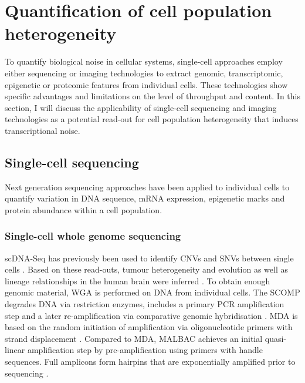 
\section{Quantification of cell population heterogeneity} 

To quantify biological noise in cellular systems, single-cell approaches employ either sequencing or imaging technologies to extract genomic, transcriptomic, epigenetic or proteomic features from individual cells. These technologies show specific advantages and limitations on the level of throughput and content. In this section, I will discuss the applicability of single-cell sequencing and imaging technologies as a potential read-out for cell population heterogeneity that induces transcriptional noise.

\subsection{Single-cell sequencing}

Next generation sequencing approaches have been applied to individual cells to quantify variation in DNA sequence, mRNA expression, epigenetic marks and protein abundance within a cell population. 

\subsubsection{Single-cell whole genome sequencing}

\Gls{scDNA-Seq} has previously been used to identify CNVs and SNVs between single cells \citep{Shpunt2012}. Based on these read-outs, tumour heterogeneity and evolution \citep{Navin2011} as well as lineage relationships in the human brain were inferred \citep{Evrony2015}. To obtain enough genomic material, \gls{WGA} is performed on DNA from individual cells. The \gls{SCOMP} degrades DNA via restriction enzymes, includes a primary \gls{PCR} amplification step and a later re-amplification via comparative genomic hybridisation \citep{Klein1999}. \Gls{MDA} is based on the random initiation of amplification via oligonucleotide primers with strand displacement \citep{Dean2002}. Compared to MDA, \gls{MALBAC} achieves an initial quasi-linear amplification step by pre-amplification using primers with handle sequences. Full amplicons form hairpins that are exponentially amplified prior to sequencing \citep{Shpunt2012}. \\

